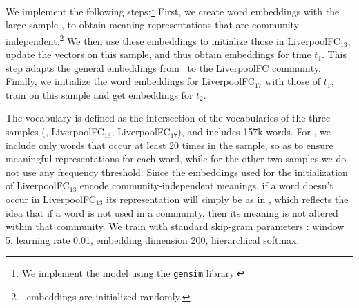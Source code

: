 We implement the following steps:\footnote{We implement the model
using the \texttt{gensim} library.}   
First, we create word embeddings with the large sample \redd, to obtain meaning
representations that are community-independent.\footnote{\redd\ embeddings are initialized randomly.} 
We then use these embeddings
to initialize those in LiverpoolFC$_{13}$, update the vectors on this
sample, and thus obtain embeddings for time $t_1$. This step
adapts the general embeddings from \redd\  to the
LiverpoolFC community. Finally, we
initialize the word embeddings for LiverpoolFC$_{17}$ with those of $t_1$, train on this sample and get embeddings for $t_2$.


The vocabulary is defined as the intersection of the
vocabularies of the three samples (\redd, LiverpoolFC$_{13}$,
LiverpoolFC$_{17}$), and includes 157k words.
For \redd, we include only words that occur at least 20 times in the
sample, so as to ensure meaningful representations for each word,
while for the other two samples we do not use any frequency
threshold: Since the embeddings used for the initialization of
LiverpoolFC$_{13}$ encode community-independent meanings, if a word doesn't occur in
LiverpoolFC$_{13}$ its representation will simply be as in \redd,
which reflects the idea that if a word is not used in a community, then its meaning is not altered within
that community. 
We train with standard skip-gram parameters \cite{levy2015improving}: window 5, learning rate 0.01, embedding dimension 200, hierarchical softmax.




